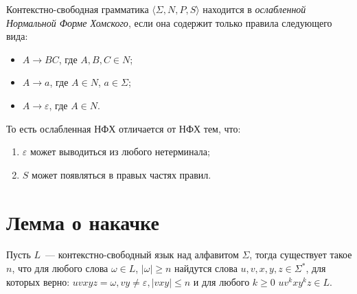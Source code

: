 \begin{definition}
    \label{defn:wCNF}
    Контекстно-свободная грамматика $\langle \Sigma, N, P, S\rangle$ находится в \emph{ослабленной Нормальной Форме Хомского}, если она содержит только правила следующего вида:
    \begin{itemize}
        \item $A \to B C$, где $A, B, C \in N$;
        \item $A \to a$, где $A \in N$, $a \in \Sigma$;
        \item $A \to \varepsilon$, где $A \in N$.
    \end{itemize}
\end{definition}

То есть ослабленная НФХ отличается от НФХ тем, что:
\begin{enumerate}
    \item $\varepsilon$ может выводиться из любого нетерминала;
    \item $S$ может появляться в правых частях правил.
\end{enumerate}


\section{Лемма о накачке}

\begin{lemma}
    Пусть $L$~--- контекстно-свободный язык над алфавитом $\Sigma$, тогда существует такое $n$, что для любого слова $\omega \in L$, $|\omega| \geq n$ найдутся слова $u,v,x,y,z\in \Sigma^*$, для которых верно: $uvxyz = \omega, vy\neq \varepsilon,|vxy|\leq n$ и для любого $k \geq 0$  $uv^kxy^kz \in L$.
\end{lemma}

